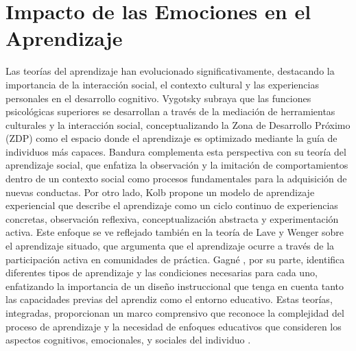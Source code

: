 \section{Impacto de las Emociones en el Aprendizaje}

Las teorías del aprendizaje han evolucionado significativamente, destacando la importancia de la interacción social, el contexto cultural y las experiencias personales en el desarrollo cognitivo. Vygotsky \citeyear{vygotskij_mind_1981} subraya que las funciones psicológicas superiores se desarrollan a través de la mediación de herramientas culturales y la interacción social, conceptualizando la Zona de Desarrollo Próximo (ZDP) como el espacio donde el aprendizaje es optimizado mediante la guía de individuos más capaces. Bandura \citeyear{bandura_social_1977} complementa esta perspectiva con su teoría del aprendizaje social, que enfatiza la observación y la imitación de comportamientos dentro de un contexto social como procesos fundamentales para la adquisición de nuevas conductas. Por otro lado, Kolb \citeyear{kolb_experiential_2015} propone un modelo de aprendizaje experiencial que describe el aprendizaje como un ciclo continuo de experiencias concretas, observación reflexiva, conceptualización abstracta y experimentación activa. Este enfoque se ve reflejado también en la teoría de Lave y Wenger \citeyear{lave_situated_1991} sobre el aprendizaje situado, que argumenta que el aprendizaje ocurre a través de la participación activa en comunidades de práctica. Gagné \citeyear{gagne_conditions_1970}, por su parte, identifica diferentes tipos de aprendizaje y las condiciones necesarias para cada uno, enfatizando la importancia de un diseño instruccional que tenga en cuenta tanto las capacidades previas del aprendiz como el entorno educativo. Estas teorías, integradas, proporcionan un marco comprensivo que reconoce la complejidad del proceso de aprendizaje y la necesidad de enfoques educativos que consideren los aspectos cognitivos, emocionales, y sociales del individuo \cite{bransford_how_2000, illeris_towards_2003}.

